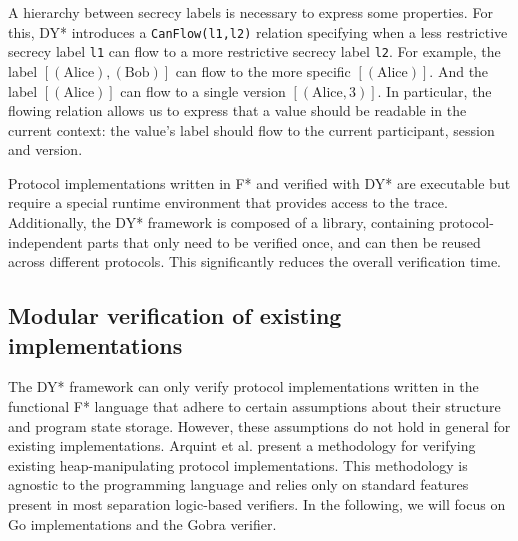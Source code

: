 A hierarchy between secrecy labels is necessary to express some properties. For this, DY* introduces a \texttt{CanFlow(l1,l2)} relation specifying when a less restrictive secrecy label \texttt{l1} can flow to a more restrictive secrecy label \texttt{l2}.
For example, the label $[(\text{Alice}), (\text{Bob})]$ can flow to the more specific $[(\text{Alice})]$. And the label $[(\text{Alice})]$ can flow to a single version $[(\text{Alice}, 3)]$.
In particular, the flowing relation allows us to express that a value should be readable in the current context: the value's label should flow to the current participant, session and version.

Protocol implementations written in F* and verified with DY* are executable but require a special runtime environment that provides access to the trace. Additionally, the DY* framework is composed of a library, containing protocol-independent parts that only need to be verified once, and can then be reused across different protocols. This significantly reduces the overall verification time.

\subsection{Modular verification of existing implementations}
\label{sec:modular-verification-of-existing-implementations}

The DY* framework can only verify protocol implementations written in the functional F* language that adhere to certain assumptions about their structure and program state storage.
However, these assumptions do not hold in general for existing implementations.
Arquint et al.\cite{} present a methodology for verifying existing heap-manipulating protocol implementations. This methodology is agnostic to the programming language and relies only on standard features present in most separation logic-based verifiers. In the following, we will focus on Go implementations and the Gobra\cite{} verifier.

